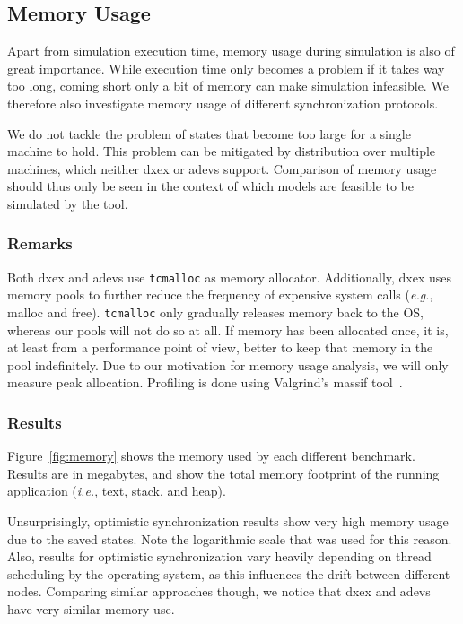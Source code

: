 \subsection{Memory Usage}
Apart from simulation execution time, memory usage during simulation is also of great importance.
While execution time only becomes a problem if it takes way too long, coming short only a bit of memory can make simulation infeasible.
We therefore also investigate memory usage of different synchronization protocols.

We do not tackle the problem of states that become too large for a single machine to hold.
This problem can be mitigated by distribution over multiple machines, which neither dxex or adevs support.
Comparison of memory usage should thus only be seen in the context of which models are feasible to be simulated by the tool.

\subsubsection{Remarks}
Both dxex and adevs use \texttt{tcmalloc} as memory allocator.
Additionally, dxex uses memory pools to further reduce the frequency of expensive system calls (\textit{e.g.}, malloc and free).
\texttt{tcmalloc} only gradually releases memory back to the OS, whereas our pools will not do so at all.
If memory has been allocated once, it is, at least from a performance point of view, better to keep that memory in the pool indefinitely.
Due to our motivation for memory usage analysis, we will only measure peak allocation.
Profiling is done using Valgrind's massif tool~\cite{Nethercote:2007:VFH:1273442.1250746}.

\subsubsection{Results}
Figure~\ref{fig:memory} shows the memory used by each different benchmark.
Results are in megabytes, and show the total memory footprint of the running application (\textit{i.e.}, text, stack, and heap).

Unsurprisingly, optimistic synchronization results show very high memory usage due to the saved states.
Note the logarithmic scale that was used for this reason.
Also, results for optimistic synchronization vary heavily depending on thread scheduling by the operating system, as this influences the drift between different nodes.
Comparing similar approaches though, we notice that dxex and adevs have very similar memory use.

